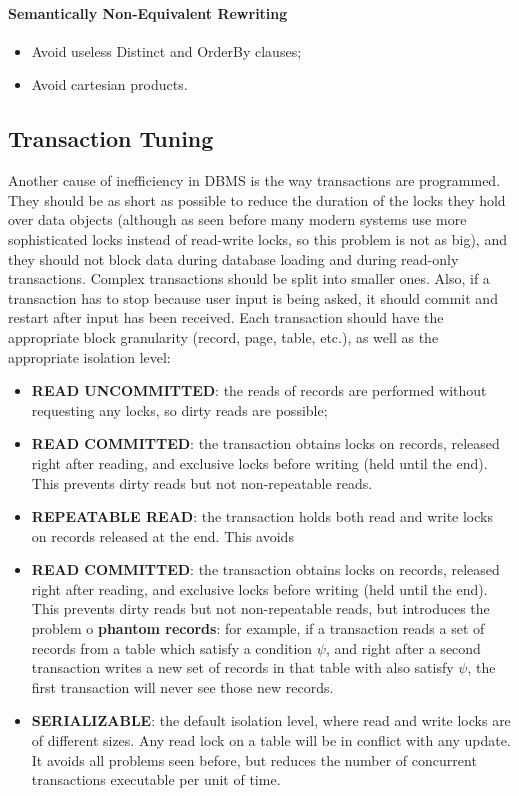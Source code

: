 \paragraph{Semantically Non-Equivalent Rewriting}
\begin{itemize}
    \item Avoid useless Distinct and OrderBy clauses;
    
    \item Avoid cartesian products.
\end{itemize}

\subsection{Transaction Tuning}

Another cause of inefficiency in DBMS is the way transactions are programmed. They should be as short as possible to reduce the duration of the locks they hold over data objects (although as seen before many modern systems use more sophisticated locks instead of read-write locks, so this problem is not as big), and they should not block data during database loading and during read-only transactions. Complex transactions should be split into smaller ones. Also, if a transaction has to stop because user input is being asked, it should commit and restart after input has been received. Each transaction should have the appropriate block granularity (record, page, table, etc.), as well as the appropriate isolation level:
\begin{itemize}
    \item \textbf{READ UNCOMMITTED}: the reads of records are performed without requesting any locks, so dirty reads are possible;

    \item \textbf{READ COMMITTED}: the transaction obtains locks on records, released right after reading, and exclusive locks before writing (held until the end). This prevents dirty reads but not non-repeatable reads.

    \item \textbf{REPEATABLE READ}: the transaction holds both read and write locks on records released at the end. This avoids     \item \textbf{READ COMMITTED}: the transaction obtains locks on records, released right after reading, and exclusive locks before writing (held until the end). This prevents dirty reads but not non-repeatable reads, but introduces the problem o \textbf{phantom records}: for example, if a transaction reads a set of records from a table which satisfy a condition $\psi$, and right after a second transaction writes a new set of records in that table with also satisfy $\psi$, the first transaction will never see those new records.

    \item \textbf{SERIALIZABLE}: the default isolation level, where read and write locks are of different sizes. Any read lock on a table will be in conflict with any update. It avoids all problems seen before, but reduces the number of concurrent transactions executable per unit of time.
\end{itemize}
